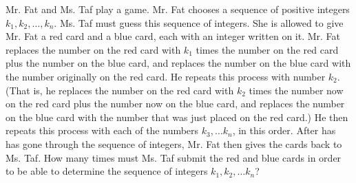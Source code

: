 Mr. Fat and Ms. Taf play a game. Mr. Fat chooses a sequence of positive integers $ k_1, k_2, \ldots , k_n$. Ms. Taf must guess this sequence of integers. She is allowed to give Mr. Fat a red card and a blue card, each with an integer written on it. Mr. Fat replaces the number on the red card with $ k_1$ times the number on the red card plus the number on the blue card, and replaces the number on the blue card with the number originally on the red card. He repeats this process with number $ k_2$. (That is, he replaces the number on the red card with $ k_2$ times the number now on the red card plus the number now on the blue card, and replaces the number on the blue card with the number that was just placed on the red card.) He then repeats this process with each of the numbers $ k_3, \ldots k_n$, in this order. After has has gone through the sequence of integers, Mr. Fat then gives the cards back to Ms. Taf. How many times must Ms. Taf submit the red and blue cards in order to be able to determine the sequence of integers $ k_1, k_2, \ldots k_n$?